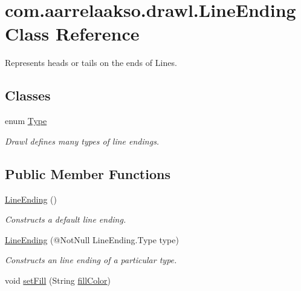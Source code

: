 \hypertarget{classcom_1_1aarrelaakso_1_1drawl_1_1_line_ending}{}\section{com.\+aarrelaakso.\+drawl.\+Line\+Ending Class Reference}
\label{classcom_1_1aarrelaakso_1_1drawl_1_1_line_ending}


Represents heads or tails on the ends of Lines.  


\subsection*{Classes}
\begin{DoxyCompactItemize}
\item 
enum \hyperlink{enumcom_1_1aarrelaakso_1_1drawl_1_1_line_ending_1_1_type}{Type}
\begin{DoxyCompactList}\small\item\em Drawl defines many types of line endings. \end{DoxyCompactList}\end{DoxyCompactItemize}
\subsection*{Public Member Functions}
\begin{DoxyCompactItemize}
\item 
\hyperlink{classcom_1_1aarrelaakso_1_1drawl_1_1_line_ending_ae3ae4bbd1469b24e585b8626872c66a9}{Line\+Ending} ()
\begin{DoxyCompactList}\small\item\em Constructs a default line ending. \end{DoxyCompactList}\item 
\hyperlink{classcom_1_1aarrelaakso_1_1drawl_1_1_line_ending_acd36154a030301e72b9c41de1b42d8bf}{Line\+Ending} (@Not\+Null Line\+Ending.\+Type type)
\begin{DoxyCompactList}\small\item\em Constructs an line ending of a particular type. \end{DoxyCompactList}\item 
void \hyperlink{classcom_1_1aarrelaakso_1_1drawl_1_1_line_ending_a4ce6efbfc8ed0129482c6105ded54877}{set\+Fill} (String \hyperlink{classcom_1_1aarrelaakso_1_1drawl_1_1_line_ending_a82865a5ebb3ae1ea53bb9dcfe35758b1}{fill\+Color})
\end{DoxyCompactItemize}
